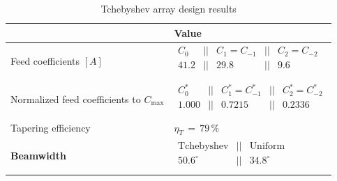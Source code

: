 \documentclass[12pt,a4paper]{article}
\begin{document}
{\begin{table}[h]
\begin{center}
{\begin{tabular}{||m{6cm}|m{6cm}||}
& \textbf{\color{Mahogany}Value} 

\\
\hline
{Feed coefficients} $[A]$ &  \footnotesize{$\begin{matrix}
C_0 & || &  C_1=C_{-1} & || & C_{2}=C_{-2} 
\\
41.2 & || & 29.8 & || & 9.6 \\
\end{matrix}$}\\
\hline 
{Normalized feed coefficients to $C_{\max}$} &  \footnotesize{$\begin{matrix}
C_0^* & || &  C_1^*=C_{-1}^* & || & C_{2}^*=C_{-2}^* 
\\
1.000 & || & 0.7215 & || & 0.2336 \\
\end{matrix}$} \\
\hline
{Tapering efficiency} & \footnotesize{$\eta_T\,=\,79\,\%$}\\ 
\hline 
\textbf{Beamwidth} & $ \begin{matrix}
\text{Tchebyshev} & || & \text{Uniform} \\

50.6^\circ & || & 34.8^\circ\\
\end{matrix} $ \\
\hline 
\end{tabular}}
\caption{Tchebyshev array design results}
\label{table:tcheby results}
\end{center}
\end{table}

}
\end{document}
